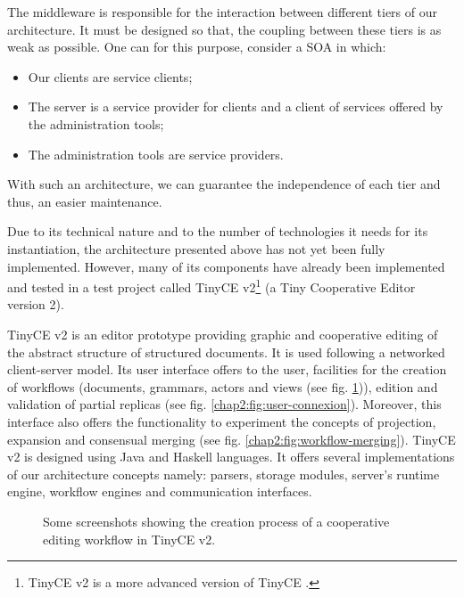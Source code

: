 \label{chap2:sec:archi-middleware}
The middleware is responsible for the interaction between different tiers of our architecture. It must be designed so that, the coupling between these tiers is as weak as possible. One can for this purpose, consider a SOA in which:
\begin{itemize}
\item Our clients are service clients;
\item The server is a service provider for clients and a client of services offered by the administration tools;
\item The administration tools are service providers.
\end{itemize}
With such an architecture, we can guarantee the independence of each tier and thus, an easier maintenance.


\label{chap2:sec:archi-tinyce-v2}

\label{chap2:sec:archi-tinyce-v2-presentation}
Due to its technical nature and to the number of technologies it needs for its instantiation, the architecture presented above has not yet been fully implemented. However, many of its components have already been implemented and tested in a test project called TinyCE v2\footnote{TinyCE v2 is a more advanced version of TinyCE \cite{artTinyCE}.} (a Tiny Cooperative Editor version 2).

TinyCE v2 is an editor prototype providing graphic and cooperative editing of the abstract structure of structured documents. It is used following a networked client-server model. Its user interface offers to the user, facilities for the creation of workflows (documents, grammars, actors and views (see fig. \ref{chap2:fig:workflow-creation})), edition and validation of partial replicas (see fig. \ref{chap2:fig:user-connexion}). 
Moreover, this interface also offers the functionality to experiment the concepts of projection, expansion and consensual merging (see fig. \ref{chap2:fig:workflow-merging}). TinyCE v2 is designed using Java and Haskell languages. It offers several implementations of our architecture concepts namely: parsers, storage modules, server's runtime engine, workflow engines and communication interfaces.
\begin{figure}[ht!]
	\noindent
	\caption{Some screenshots showing the creation process of a cooperative editing workflow in TinyCE v2.}
	\label{chap2:fig:workflow-creation}
\end{figure}

